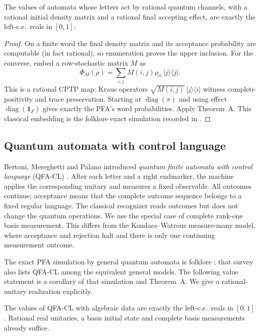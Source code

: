 \documentclass[11pt]{article}
\theoremstyle{plain}
\theoremstyle{definition}
\theoremstyle{remark}
\newcommand{\ind}{\mathbf 1}
\begin{document}
\begin{proposition}\label{prop:cptp}
The values of automata whose letters act by rational quantum channels, with a rational initial density matrix and a rational final accepting effect, are exactly the left-c.e.\ reals in $[0,1]$.
\end{proposition}

\begin{proof}
On a finite word the final density matrix and its acceptance probability are computable (in fact rational), so enumeration proves the upper inclusion. For the converse, embed a row-stochastic matrix $M$ as
\[
 \Phi_M(\rho)=\sum_{i,j}M(i,j)\rho_{ii}\,|j\rangle\langle j|.
\]
This is a rational CPTP map: Kraus operators $\sqrt{M(i,j)}\,|j\rangle\langle i|$ witness complete positivity and trace preservation. Starting at $\operatorname{diag}(\pi)$ and using effect $\operatorname{diag}(\ind_F)$ gives exactly the PFA's word probabilities. Apply Theorem~A. This classical embedding is the folklore exact simulation recorded in \cite[Theorem~4.2]{AY15}.
\end{proof}

\subsection{Quantum automata with control language}

Bertoni, Mereghetti and Palano introduced \emph{quantum finite automata with control language} (QFA-CL) \cite{BMP03,MP06}. After each letter and a right endmarker, the machine applies the corresponding unitary and measures a fixed observable. All outcomes continue; acceptance means that the complete outcome sequence belongs to a fixed regular language. The classical recognizer reads outcomes but does not change the quantum operations. We use the special case of complete rank-one basis measurement. This differs from the Kondacs--Watrous measure-many model, where acceptance and rejection halt and there is only one continuing measurement outcome.

The exact PFA simulation by general quantum automata is folklore \cite[Theorem~4.2]{AY15}; that survey also lists QFA-CL among the equivalent general models. The following value statement is a corollary of that simulation and Theorem~A. We give a rational-unitary realization explicitly.

\begin{corollary}\label{cor:qfacl}
The values of QFA-CL with algebraic data are exactly the left-c.e.\ reals in $[0,1]$. Rational real unitaries, a basis initial state and complete basis measurements already suffice.
\end{corollary}
\end{document}
